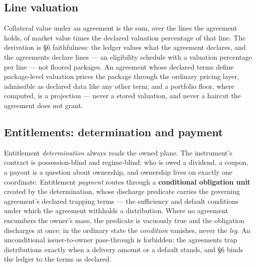 \subsection{Line valuation}

Collateral value under an agreement is the sum, over the lines the agreement
holds, of market value times the declared valuation percentage of that line.
The derivation is \S6 faithfulness: the ledger values what the agreement
declares, and the agreements declare lines --- an eligibility schedule with a
valuation percentage per line --- not floored packages. An agreement whose
declared terms define package-level valuation prices the package through the
ordinary pricing layer, admissible as declared data like any other term; and a
portfolio floor, where computed, is a projection --- never a stored valuation,
and never a haircut the agreement does not grant.

\subsection{Entitlements: determination and payment}

Entitlement \emph{determination} always reads the owned plane. The
instrument's contract is possession-blind and regime-blind: who is owed a
dividend, a coupon, a payout is a question about ownership, and ownership
lives on exactly one coordinate. Entitlement \emph{payment} routes through a
\textbf{conditional obligation unit} created by the determination, whose
discharge predicate carries the governing agreement's declared trapping terms
--- the sufficiency and default conditions under which the agreement withholds
a distribution. Where no agreement encumbers the owner's mass, the predicate
is vacuously true and the obligation discharges at once: in the ordinary state
the \emph{condition} vanishes, never the \emph{leg}. An unconditional
issuer-to-owner pass-through is forbidden: the agreements trap distributions
exactly when a delivery amount or a default stands, and \S6 binds the ledger
to the terms as declared.

